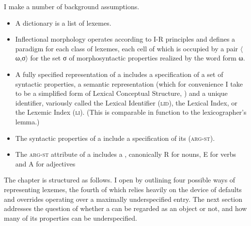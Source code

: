\documentclass[output=paper]{langsci/langscibook}
\begin{document}
I make a number of background assumptions.

\begin{itemize}

\item	A dictionary is a list of lexemes.

\sloppy
\item	Inflectional morphology operates according to I-R principles and defines a para\-digm for each class of lexemes, each cell of which is occupied by a pair $\langle$ω,σ$\rangle$ for the set σ of morphosyntactic properties realized by the word form ω.
\fussy 

\item	A fully specified representation of a  includes a specification of a set of syntactic properties, a semantic representation (which for convenience I take to be a simplified form of Lexical Conceptual Structure, \citealt{Jackendoff90}) and a unique identifier, variously called the Lexical Identifier (\textsc{lid}), the Lexical Index, or  the Lexemic Index (\textsc{li}). (This is comparable in function to the lexicographer's lemma.)

\item
The syntactic properties of a  include a specification of its  (\textsc{arg-st}).

\item
The \textsc{arg-st} attribute of a  includes a  %
\citep[SF role,][]{Spencer13}%
%
, canonically R for nouns, E for verbs and A for adjectives
\end{itemize}

The chapter is structured as follows. %
I open by outlining four possible ways of representing lexemes, the fourth of which relies heavily on the device of defaults and overrides operating over a maximally underspecified entry. The next section addresses  the question of whether a  can be regarded as an object or not, %
and how many of its properties can be underspecified.
\end{document}
